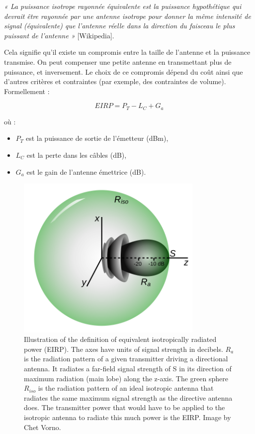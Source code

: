 \textit{« La puissance isotrope rayonnée équivalente est la puissance hypothétique qui devrait être rayonnée par une antenne isotrope pour donner la même intensité de signal (équivalente) que l'antenne réelle dans la direction du faisceau le plus puissant de l'antenne »} [Wikipedia]. 

Cela signifie qu’il existe un compromis entre la taille de l’antenne et la puissance transmise. On peut compenser une petite antenne en transmettant plus de puissance, et inversement. Le choix de ce compromis dépend du coût ainsi que d’autres critères et contraintes (par exemple, des contraintes de volume). Formellement :

\begin{equation}
    EIRP = P_T - L_C + G_a
\end{equation}

où :

\begin{itemize}
    \item $P_T$ est la puissance de sortie de l’émetteur (dBm),
    \item $L_C$ est la perte dans les câbles (dB),
    \item $G_a$ est le gain de l’antenne émettrice (dB).
\end{itemize}

\begin{figure}[H] %
    \centering
    \includegraphics[width=0.8\textwidth]{figures/6-55.png}
    
    \caption{Illustration of the definition of equivalent isotropically radiated power (EIRP). The axes have units of signal strength in decibels. $R_a$ is the radiation pattern of a given transmitter driving a directional antenna. It radiates a far-field signal strength of S in its direction of maximum radiation (main lobe) along the z-axis. The green sphere $R_{iso}$ is the radiation pattern of an ideal isotropic antenna that radiates the same maximum signal strength as the directive antenna does. The transmitter power that would have to be applied to the isotropic antenna to radiate this much power is the EIRP. Image by Chet Vorno.}
    \label{fig:communication2}
\end{figure}

